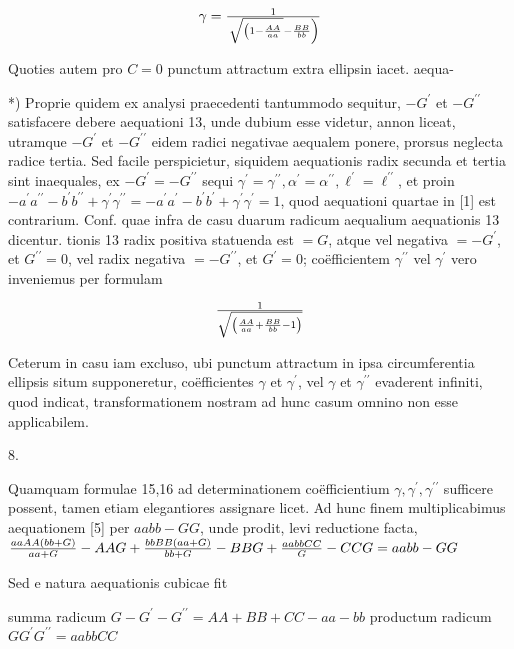 \documentclass[twoside,12pt, showframe]{memoir}
\let\oldfrac\frac
\def\frac#1#2{\mathchoice{\tfrac{#1}{#2}}{\oldfrac{#1}{#2}}{\genfrac{}{}{}{2}{#1}{#2\mathstrut}}{\genfrac{}{}{}{3}{#1}{#2\mathstrut}}}
\begin{document}
\[
\gamma=\frac{1}{\left.\sqrt{\left(1-\frac{A A}{a a}\right.}-\frac{B B}{b b}\right)}
\]

Quoties autem pro \(C=0\) punctum attractum extra ellipsin iacet. aequa-

*) Proprie quidem ex analysi praecedenti tantummodo sequitur, \(-G^{\prime}\) et \(-G^{\prime \prime}\) satisfacere debere aequationi 13, unde dubium esse videtur, annon liceat, utramque \(-G^{\prime}\) et \(-G^{\prime \prime}\) eidem radici negativae aequalem ponere, prorsus neglecta radice tertia. Sed facile perspicietur, siquidem aequationis radix secunda et tertia sint inaequales, ex \(-G^{\prime}=-G^{\prime \prime}\) sequi \(\gamma^{\prime}=\gamma^{\prime \prime}, \alpha^{\prime}=\alpha^{\prime \prime}, \ell^{\prime}=\ell^{\prime \prime}\), et proin \(-a^{\prime} a^{\prime \prime}-b^{\prime} b^{\prime \prime}+\gamma^{\prime} \gamma^{\prime \prime}=-a^{\prime} a^{\prime}-b^{\prime} b^{\prime}+\gamma^{\prime} \gamma^{\prime}=1\), quod aequationi quartae in [1] est contrarium. Conf. quae infra de casu duarum radicum aequalium aequationis 13 dicentur.
tionis 13 radix positiva statuenda est \(=G\), atque vel negativa \(=-G^{\prime}\), et \(G^{\prime \prime}=0\), vel radix negativa \(=-G^{\prime \prime}\), et \(G^{\prime}=0\); coëfficientem \(\gamma^{\prime \prime}\) vel \(\gamma^{\prime}\) vero inveniemus per formulam

\[
\frac{1}{\sqrt{\left(\frac{A A}{a a}+\frac{B B}{b b}-1\right)}}
\]

Ceterum in casu iam excluso, ubi punctum attractum in ipsa circumferentia ellipsis situm supponeretur, coëfficientes \(\gamma\) et \(\gamma^{\prime}\), vel \(\gamma\) et \(\gamma^{\prime \prime}\) evaderent infiniti, quod indicat, transformationem nostram ad hunc casum omnino non esse applicabilem.

8.

Quamquam formulae 15,16 ad determinationem coëfficientium \(\gamma, \gamma^{\prime}, \gamma^{\prime \prime}\) sufficere possent, tamen etiam elegantiores assignare licet. Ad hunc finem multiplicabimus aequationem [5] per \(a a b b-G G\), unde prodit, levi reductione facta, \(\frac{a a A A(b b+G)}{a a+G}-A A G+\frac{b b B B(a a+G)}{b b+G}-B B G+\frac{a a b b C C}{G}-C C G=a a b b-G G\)

Sed e natura aequationis cubicae fit

summa radicum \(G-G^{\prime}-G^{\prime \prime}=A A+B B+C C-a a-b b\) productum radicum \(G G^{\prime} G^{\prime \prime}=a a b b C C\)
\end{document}

